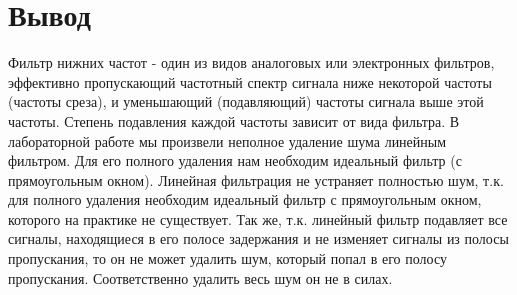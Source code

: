 \section{Вывод}

Фильтр нижних частот - один из видов аналоговых или электронных фильтров, эффективно пропускающий частотный спектр сигнала ниже некоторой частоты (частоты среза), и уменьшающий (подавляющий) частоты сигнала выше этой частоты. Степень подавления каждой частоты зависит от
вида фильтра. В лабораторной работе мы произвели неполное удаление шума линейным фильтром. Для его полного удаления нам необходим идеальный фильтр (с прямоугольным окном). Линейная фильтрация не устраняет
полностью шум, т.к. для полного удаления необходим идеальный фильтр
с прямоугольным окном, которого на практике не существует. Так же, т.к. линейный фильтр подавляет все сигналы, находящиеся в его полосе задержания и не изменяет сигналы из полосы пропускания, то он не может
удалить шум, который попал в его полосу пропускания. Соответственно
удалить весь шум он не в силах.
